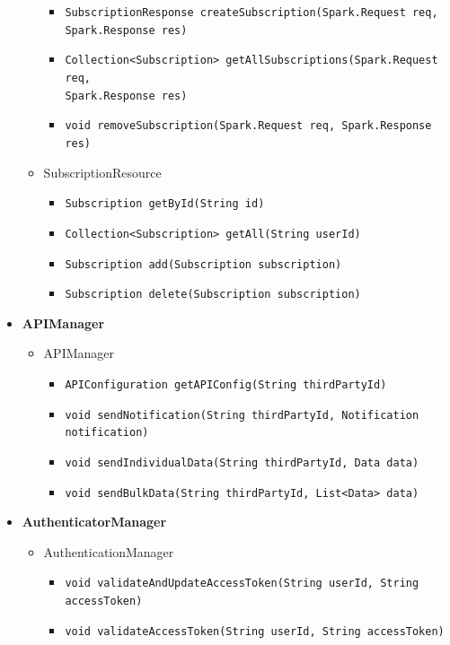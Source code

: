 \documentclass[a4paper, hidelinks, 12pt]{report}
\begin{document}
\begin{itemize}
\begin{itemize}
					\begin{itemize}
						\item{\verb|SubscriptionResponse createSubscription(Spark.Request req,|\\ \verb|Spark.Response res)|}
						\item{\verb|Collection<Subscription> getAllSubscriptions(Spark.Request req,|\\ \verb|Spark.Response res)|}
						\item{\verb|void removeSubscription(Spark.Request req, Spark.Response res)|}
					\end{itemize}
				\item{SubscriptionResource}
					\begin{itemize}
						\item{\verb|Subscription getById(String id)|}
						\item{\verb|Collection<Subscription> getAll(String userId)|}
						\item{\verb|Subscription add(Subscription subscription)|}
						\item{\verb|Subscription delete(Subscription subscription)|}
					\end{itemize}
			\end{itemize}
			\item{\textbf{APIManager}}
			\begin{itemize}
				\item{APIManager}
					\begin{itemize}
						\item{\verb|APIConfiguration getAPIConfig(String thirdPartyId)|}
						\item{\verb|void sendNotification(String thirdPartyId, Notification notification)|}
						\item{\verb|void sendIndividualData(String thirdPartyId, Data data)|}
						\item{\verb|void sendBulkData(String thirdPartyId, List<Data> data)|}
					\end{itemize}
			\end{itemize}
			\item{\textbf{AuthenticatorManager}}
			\begin{itemize}
				\item{AuthenticationManager}
					\begin{itemize}
						\item{\verb|void validateAndUpdateAccessToken(String userId, String accessToken)|}
						\item{\verb|void validateAccessToken(String userId, String accessToken)|}

\end{itemize}
\end{itemize}
\end{itemize}
\end{document}
